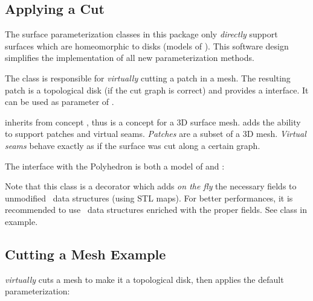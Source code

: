 \subsection{Applying a Cut}

The surface parameterization classes in this package only \emph{directly} support
 surfaces which are homeomorphic to disks (models of
). This software design simplifies the
implementation of all new parameterization methods.

The 
class is responsible for \emph{virtually} cutting
a patch in a  mesh.
The resulting patch is a topological
disk (if the cut graph is correct)
and provides a  interface. It can be used as
parameter of .

 inherits from concept ,
thus is a concept for a 3D surface mesh.
 adds the ability to support patches and
virtual seams. \emph{Patches} are a subset of a 3D mesh.
\emph{Virtual seams} behave exactly as if the surface was cut along a certain graph.

The  interface with the Polyhedron is both a model of
 and : \\

Note that this class is a decorator which adds {\em on the fly}
the necessary fields to unmodified \cgal\ data structures (using STL
maps). For better performances, it is recommended to use \cgal\ data
structures enriched with the proper fields. See 
class in  example.


\subsection{Cutting a Mesh Example}

 \emph{virtually} cuts a
 mesh
to make it a topological disk, then applies the default parameterization:



